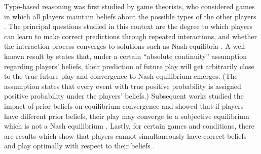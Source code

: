 \documentclass[final,1p,times,authoryear]{elsarticle}
\begin{document}
Type-based reasoning was first studied by game theorists, who considered games in which all players maintain beliefs about the possible types of the other players \citep{h1967}. The principal questions studied in this context are the degree to which players can learn to make correct predictions through repeated interactions, and whether the interaction process converges to solutions such as Nash equilibria \citep{n1950}. A well-known result by \citet{kl1993} states that, under a certain ``absolute continuity'' assumption regarding players' beliefs, their prediction of future play will get arbitrarily close to the true future play and convergence to Nash equilibrium emerges. (The assumption states that every event with true positive probability is assigned positive probability under the players' beliefs.) Subsequent works studied the impact of prior beliefs on equilibrium convergence and showed that if players have different prior beliefs, their play may converge to a subjective equilibrium which is not a Nash equilibrium \citep{dfl2004,n1998}. Lastly, for certain games and conditions, there are results which show that players cannot simultaneously have correct beliefs and play optimally with respect to their beliefs \citep{n2005,fy2001}.
\end{document}
